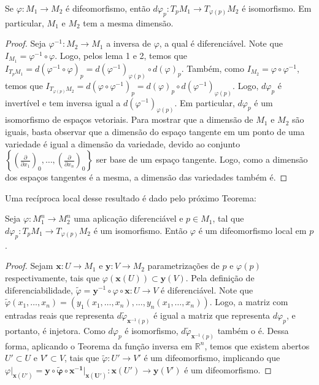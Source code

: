 \begin{proposition}
    \label{loc:prop_3_:_difeomorfismo_preserva_dimensão_da_variedade_e_do_espaço_tangente..proposição}
    Se $\varphi:M_{1}\to M_{2}$ é difeomorfismo, então $d\varphi_{p}:T_{p}M_{1}\to T_{\varphi(p)}M_{2}$ é isomorfismo. Em particular, $M_{1}$ e $M_{2}$ tem a mesma dimensão.
    \begin{proof}

        Seja $\varphi ^{-1}:M_{2}\to M_{1}$ a inversa de $\varphi$, a qual é diferenciável. Note que $I_{M_{1}} =\varphi ^{-1} \circ \varphi$. Logo, pelos lema 1 e 2, temos que $I_{T_{p}M_{1}}=d(\varphi ^{-1} \circ \varphi)_{p}= d(\varphi ^{-1})_{\varphi(p)} \circ d(\varphi)_{p}$.
        Também, como $I_{M_{2}}=\varphi \circ\varphi ^{-1}$, temos que $I_{T_{\varphi(p)}M_{2}}=d(\varphi \circ \varphi ^{-1})_{p}= d(\varphi)_{p} \circ d(\varphi ^{-1})_{\varphi(p)}$.
        Logo, $d\varphi_{p}$ é invertível e tem inversa igual a $d(\varphi ^{-1})_{\varphi(p)}$. Em particular, $d\varphi_{p}$ é um isomorfismo de espaços vetoriais.
        Para mostrar que a dimensão de $M_{1}$ e $M_{2}$ são iguais, basta observar que a dimensão do espaço tangente em um ponto de uma variedade é igual a dimensão da variedade, devido ao conjunto $\left\{  \left( \frac{\partial}{\partial x_{1}} \right)_{0}, \dots, \left( \frac{\partial}{\partial x_{n}} \right)_{0}  \right\}$ ser base de um espaço tangente. Logo, como a dimensão dos espaços tangentes é a mesma, a dimensão das variedades também é.
    \end{proof}
\end{proposition}
Uma recíproca local desse resultado é dado pelo próximo Teorema:
\begin{theorem}
    \label{loc:3.7_:_teo_1_:_função_inversa_para_variedades_(reciproca_da_prop_3)}
    Seja $\varphi:M_{1}^{n}\to M_{2}^{n}$ uma aplicação diferenciável e $p \in M_{1}$, tal que $d\varphi_{p}:T_{p}M_{1}\to T_{\varphi(p)}M_{2}$ é um isomorfismo. Então $\varphi$ é um difeomorfismo local em $p$.
    \begin{proof}

        Sejam $\mathbf{x}:U\to M_{1}$ e $\mathbf{y}:V\to M_{2}$ parametrizações de $p$ e $\varphi(p)$ respectivamente, tais que $\varphi(\mathbf{x}(U)) \subset \mathbf{y}(V)$.
        Pela definição de diferenciabilidade, $\tilde{\varphi} =\mathbf{y}^{-1} \circ \varphi \circ \mathbf{ x}:U \to V$ é diferenciável. Note que $\tilde{\varphi}(x_{1}, \dots, x_{n})=(y_{1}(x_{1}, \dots, x_{n}), \dots, y_{n}(x_{1}, \dots, x_{n}))$. Logo, a matriz com entradas reais que representa $d\tilde{\varphi}_{\mathbf{x}^{-1}(p)}$ é igual a matriz que representa $d\varphi_{p}$, e portanto, é injetora. Como $d\varphi_{p}$ é isomorfismo, $d \tilde{\varphi}_{\mathbf{x}^{-1}(p)}$ também o é. Dessa forma, aplicando o Teorema da função inversa em $\mathbb{R}^{n}$, temos que existem abertos $U' \subset U$ e $V' \subset V$, tais que $\tilde{\varphi}:U' \to V'$ é um difeomorfismo, implicando que $\varphi|_{\mathbf{x}(U')} = \mathbf{y \circ \tilde{\varphi} \circ x ^{-1}|_{\mathbf{x}(U')}}:\mathbf{x}(U')\to \mathbf{y}(V')$ é um difeomorfismo.
    \end{proof}
\end{theorem}
